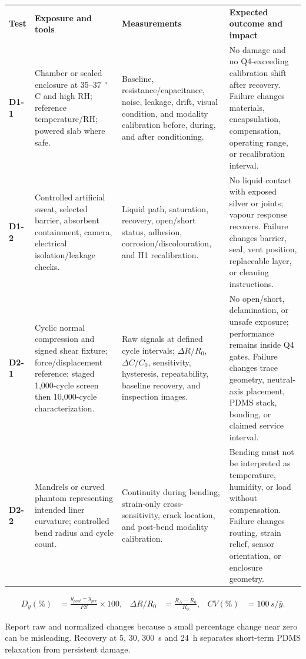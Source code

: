 \vspace{0.4em}
\begingroup
\fontsize{7.65}{8.95}\selectfont
\setlength{\tabcolsep}{2.55pt}\renewcommand{\arraystretch}{1.04}
\begin{tabularx}{\linewidth}{>{\raggedright\arraybackslash\bfseries\color{AUBRed}}p{1.05cm}Y Y Y}
\color{white}\textbf{Test} & \color{white}\textbf{Exposure and tools} &
\color{white}\textbf{Measurements} & \color{white}\textbf{Expected outcome and impact} \\
D1-1 & Chamber or sealed enclosure at 35--37~$^{\circ}$C and high RH; reference
temperature/RH; powered slab where safe. & Baseline, resistance/capacitance,
noise, leakage, drift, visual condition, and modality calibration before,
during, and after conditioning. & No damage and no Q4-exceeding calibration
shift after recovery. Failure changes materials, encapsulation, compensation,
operating range, or recalibration interval. \\
D1-2 & Controlled artificial sweat, selected barrier, absorbent containment,
camera, electrical isolation/leakage checks. & Liquid path, saturation,
recovery, open/short status, adhesion, corrosion/discolouration, and H1
recalibration. & No liquid contact with exposed silver or joints; vapour
response recovers. Failure changes barrier, seal, vent position, replaceable
layer, or cleaning instructions. \\
D2-1 & Cyclic normal compression and signed shear fixture; force/displacement
reference; staged 1,000-cycle screen then 10,000-cycle characterization. & Raw
signals at defined cycle intervals; $\Delta R/R_0$, $\Delta C/C_0$, sensitivity,
hysteresis, repeatability, baseline recovery, and inspection images. & No
open/short, delamination, or unsafe exposure; performance remains inside Q4
gates. Failure changes trace geometry, neutral-axis placement, PDMS stack,
bonding, or claimed service interval. \\
D2-2 & Mandrels or curved phantom representing intended liner curvature;
controlled bend radius and cycle count. & Continuity during bending,
strain-only cross-sensitivity, crack location, and post-bend modality
calibration. & Bending must not be interpreted as temperature, humidity, or
load without compensation. Failure changes routing, strain relief, sensor
orientation, or enclosure geometry. \\
\end{tabularx}
\endgroup

\vspace{0.35em}
\begin{align*}
D_y(\%)&=\frac{y_{post}-y_{pre}}{FS}\times100, &
\Delta R/R_0&=\frac{R_N-R_0}{R_0}, &
CV(\%)&=100\,s/\bar y.
\end{align*}
{\fontsize{7.5}{8.7}\selectfont\color{AUBGray}
Report raw and normalized changes because a small percentage change near zero
can be misleading. Recovery at 5, 30, 300~s and 24~h separates short-term PDMS
relaxation from persistent damage.\par}


